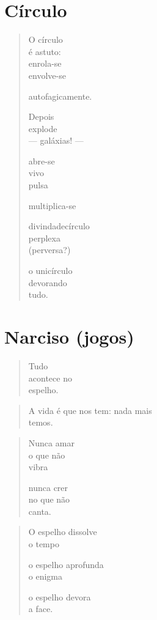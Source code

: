 \chapter{Círculo}

\begin{verse}
O círculo\\
é astuto:\\
enrola-se\\
envolve-se

autofagicamente.

Depois\\
explode\\
--- galáxias! ---

abre-se\\
vivo\\
pulsa

multiplica-se

divindadecírculo\\
perplexa\\
(perversa?)

o unicírculo\\
devorando\\
tudo.
\end{verse}

\chapter{Narciso (jogos)}

\begin{verse}
Tudo\\
acontece no\\
espelho.
\end{verse}

\pagebreak
\begin{verse}
A vida é que nos tem: nada mais\\
\qquad\qquad\qquad\quad temos.
\end{verse}

\pagebreak
\begin{verse}
Nunca amar\\
o que não\\
vibra

nunca crer\\
no que não\\
canta.
\end{verse}

\pagebreak
\begin{verse}
O espelho dissolve\\
o tempo

o espelho aprofunda\\
o enigma

o espelho devora\\
a face.
\end{verse}

